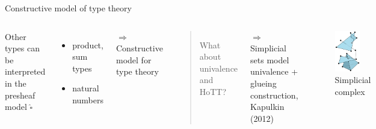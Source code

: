 \documentclass[english]{beamer}
\begin{document}
\begin{frame}{Constructive model of type theory}
 


 \begin{columns}[c]
         Other types can be interpreted in the presheaf model $\widehat{\square}$
 
 \begin{itemize}
  \item product, sum types
  \item natural numbers
 \end{itemize}
        
         $\Rightarrow$ Constructive model for type theory
 
        \begin{quotation}
        What about univalence and HoTT?
        \end{quotation}
        
        \pause
        
        $\Rightarrow$ Simplicial sets model univalence + glueing construction, Kapulkin (2012)
        \begin{figure}
       \includegraphics[width=0.7\textwidth]{figures/simplex}
       \caption{Simplicial complex}
       \end{figure}
\end{columns}
 
\end{frame}
\end{document}
